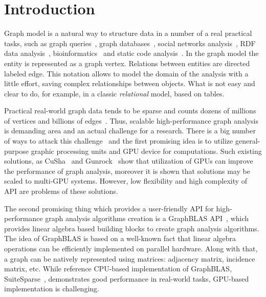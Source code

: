 \section*{Introduction}

Graph model is a natural way to structure data in a number of a real practical tasks, such as graph queries~\cite{article:querying_graph_databases}, graph databases~\cite{paper:redisgraph}, social networks analysis~\cite{article:facebook_large_scale}, RDF data analysis~\cite{article:cfpq_and_rdf_analysis}, bioinformatics~\cite{article:rna_prediction} and static code analysis~\cite{article:dyck_cfl_code_analysis}. In the graph model the entity is represented as a graph vertex. Relations between entities are directed labeled edge. This notation allows to model the domain of the analysis with a little effort, saving complex relationships between objects. What is not easy and clear to do, for example, in a classic \textit{relational} model, based on tables.

Practical real-world graph data tends to be sparse and counts dozens of millions of vertices and billions of edges~\cite{article:facebook_large_scale}. Thus, scalable high-performance graph analysis is demanding area and an actual challenge for a research. There is a big number of ways to attack this challenge~\cite{article:graph_landscape} and the first promising idea is to utilize general-purpose graphic processing units and GPU device for computations. Such existing solutions, as CuSha~\cite{article:cusha} and Gunrock~\cite{article:gunrock} show that utilization of GPUs can improve the performance of graph analysis, moreover it is shown that solutions may be scaled to multi-GPU systems. However, low flexibility and high complexity of API are problems of these solutions.

The second promising thing which provides a user-friendly API for high-performance graph analysis algorithms creation is a GraphBLAS API~\cite{paper:graphblas_foundations}, which provides linear algebra based building blocks to create graph analysis algorithms. The idea of GraphBLAS is based on a well-known fact that linear algebra operations can be efficiently implemented on parallel hardware. Along with that, a graph can be natively represented using matrices: adjacency matrix, incidence matrix, etc. While reference CPU-based implementation of GraphBLAS, SuiteSparse~\cite{article:suite_sparse_for_graph_problems}, demonstrates good performance in real-world tasks, GPU-based implementation is challenging.

